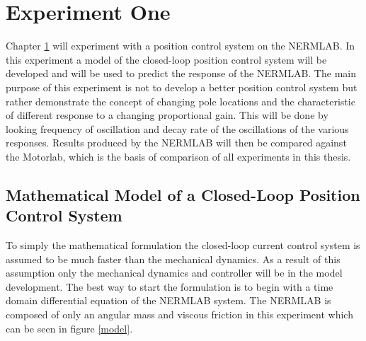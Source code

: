 
\cleardoublepage

\chapter{Experiment One}
\label{chp5}

Chapter \ref{chp5} will experiment with a position control system on the NERMLAB. In this experiment a model of the closed-loop position control system will be developed and will be used to predict the response of the NERMLAB. The main purpose of this experiment is not to develop a better position control system but rather demonstrate the concept of changing pole locations and the characteristic of different response to a changing proportional gain. This will be done by looking frequency of oscillation and decay rate of the oscillations of the various responses. Results produced by the NERMLAB will then be compared against the Motorlab, which is the basis of comparison of all experiments in this thesis. 

\section{Mathematical Model of a Closed-Loop Position Control System}

To simply the mathematical formulation the closed-loop current control system is assumed to be much faster than the mechanical dynamics. As a result of this assumption only the mechanical dynamics and controller will be in the model development.  The best way to start the formulation is to begin with a time domain differential equation of the NERMLAB system. The NERMLAB is composed of only an angular mass and viscous friction in this experiment which can be seen in figure \ref{model}.

